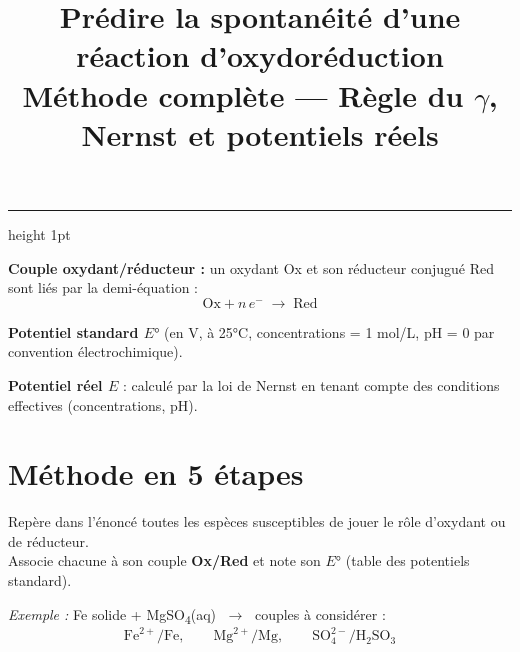\documentclass[a4paper, 11pt]{article}
\begin{document}

\title{Prédire la spontanéité d'une réaction d'oxydoréduction\\[4pt]
\large Méthode complète — Règle du $\gamma$, Nernst et potentiels réels}
\maketitle
\thispagestyle{fancy}
\vspace{-6pt}
\hrule height 1pt
\vspace{10pt}

\begin{tcolorbox}[fichebase, title={Rappels fondamentaux}]

\textbf{Couple oxydant/réducteur :} un oxydant Ox et son réducteur conjugué Red sont liés par la demi-équation :
\[
  \text{Ox} + n\,e^- \;\longrightarrow\; \text{Red}
\]

\textbf{Potentiel standard $E°$} (en V, à 25°C, concentrations = 1 mol/L, pH = 0 par convention électrochimique).

\textbf{Potentiel réel $E$} : calculé par la loi de Nernst en tenant compte des conditions effectives (concentrations, pH).

\end{tcolorbox}

\vspace{8pt}

\section*{\color{bleu}Méthode en 5 étapes}

\begin{tcolorbox}[verdebox, title={Étape 1 — Identifier les couples redox en présence}]
Repère dans l'énoncé toutes les espèces susceptibles de jouer le rôle d'oxydant ou de réducteur.\\
Associe chacune à son couple \textbf{Ox/Red} et note son $E°$ (table des potentiels standard).

\medskip
\textit{Exemple :} Fe solide + MgSO\textsubscript{4}(aq) $\;\longrightarrow\;$ couples à considérer :
\[
  \text{Fe}^{2+}/\text{Fe}, \qquad \text{Mg}^{2+}/\text{Mg}, \qquad \text{SO}_4^{2-}/\text{H}_2\text{SO}_3
\]
\end{tcolorbox}
\end{document}
